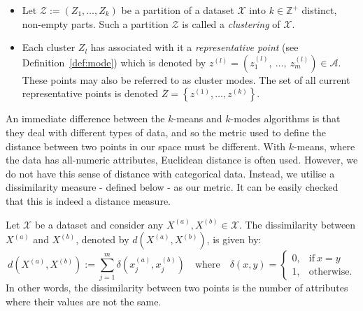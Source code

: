 \begin{itemize}
    \item Let \(\mathcal{Z} := \left(Z_1, \ldots, Z_k\right)\) be a partition
        of a dataset \(\mathcal{X}\) into \(k \in \mathbb{Z}^{+}\) distinct,
        non-empty parts. Such a partition \(\mathcal{Z}\) is called a
        \emph{clustering} of \(\mathcal{X}\).

    \item Each cluster \(Z_l\) has associated with it a \emph{representative
        point} (see Definition~\ref{def:mode}) which is denoted by \(z^{(l)} =
        \left(z_1^{(l)},~\ldots,~z_m^{(l)}\right) \in \mathcal{A}\).  These
        points may also be referred to as cluster modes. The set of all current
        representative points is denoted \(\overline Z = \left\{z^{(1)}, \ldots,
        z^{(k)}\right\}\).
\end{itemize}


An immediate difference between the \(k\)-means and \(k\)-modes algorithms is 
that they deal with different types of data, and so the metric used to define 
the distance between two points in our space must be different. With 
\(k\)-means, where the data has all-numeric attributes, Euclidean distance is 
often used. However, we do not have this sense of distance with categorical 
data. Instead, we utilise a dissimilarity measure \-- defined below \-- as our 
metric. It can be easily checked that this is indeed a distance measure.

\begin{definition}\label{def:dissim}
    Let \(\mathcal{X}\) be a dataset and consider any \(X^{(a)}, X^{(b)} \in
    \mathcal{X}\). The dissimilarity between \(X^{(a)}\) and \(X^{(b)}\),
    denoted by \(d\left(X^{(a)}, X^{(b)}\right)\), is given by:
    \begin{equation}\label{eq:dissim}
        d\left(X^{(a)}, X^{(b)}\right) := \sum_{j=1}^{m} \delta\left(x_j^{(a)},
        x_j^{(b)}\right) \quad \text{where} \quad \delta\left(x, y\right) =
        \begin{cases}
            0, & \text{if} \ x = y \\
            1, & \text{otherwise.}
        \end{cases}
    \end{equation}
    In other words, the dissimilarity between two points is the number of
    attributes where their values are not the same.
\end{definition}

%


